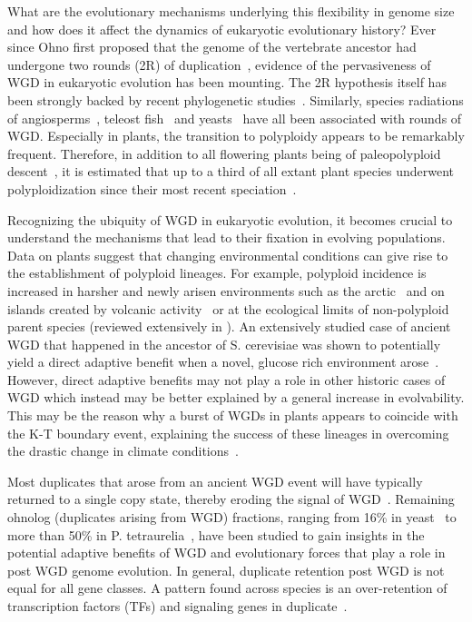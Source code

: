 What are the evolutionary mechanisms underlying this flexibility in genome size and how does it affect the dynamics of eukaryotic evolutionary history? Ever since Ohno first proposed that the genome of the vertebrate ancestor had undergone two rounds (2R) of duplication~\cite{ohno_evolution_1970}, evidence of the pervasiveness of WGD in eukaryotic evolution has been mounting. The 2R hypothesis itself has been strongly backed by recent phylogenetic studies~\cite{dehal_two_2005,nakatani_reconstruction_2007}. Similarly, species radiations of angiosperms~\cite{jiao_ancestral_2011}, teleost fish~\cite{jaillon_genome_2004} and yeasts~\cite{scannell_multiple_2006} have all been associated with rounds of WGD. Especially in plants, the transition to polyploidy appears to be remarkably frequent. Therefore, in addition to all flowering plants being of paleopolyploid descent~\cite{jiao_ancestral_2011,albert_amborella_2013}, it is estimated that up to a third of all extant plant species underwent polyploidization since their most recent speciation~\cite{mayrose_recently_2011}. 

Recognizing the ubiquity of WGD in eukaryotic evolution, it becomes crucial to understand the mechanisms that lead to their fixation in evolving populations. Data on plants suggest that changing environmental conditions can give rise to the establishment of polyploid lineages. For example, polyploid incidence is increased in harsher and newly arisen environments such as the arctic~\cite{brochmann_polyploidy_2004} and on islands created by volcanic activity~\cite{barrier_interspecific_1999} or at the ecological limits of non-polyploid parent species (reviewed extensively in \cite{beest_more_2012}). An extensively studied case of ancient WGD that happened in the ancestor of S. cerevisiae was shown to potentially yield a direct adaptive benefit when a novel, glucose rich environment arose~\cite{conant_increased_2007,van_hoek_metabolic_2009}. However, direct adaptive benefits may not play a role in other historic cases of WGD which instead may be better explained by a general increase in evolvability. This may be the reason why a burst of WGDs in plants appears to coincide with the K-T boundary event, explaining the success of these lineages in overcoming the drastic change in climate conditions~\cite{fawcett_plants_2009,van_de_peer_evolutionary_2009}.

Most duplicates that arose from an ancient WGD event will have typically returned to a single copy state, thereby eroding the signal of WGD~\cite{scannell_multiple_2006}. Remaining ohnolog (duplicates arising from WGD) fractions, ranging from 16\% in yeast~\cite{kellis_proof_2004} to more than 50\% in P. tetraurelia~\cite{aury_global_2006}, have been studied to gain insights in the potential adaptive benefits of WGD and evolutionary forces that play a role in post WGD genome evolution. In general, duplicate retention post WGD is not equal for all gene classes. A pattern found across species is an over-retention of transcription factors (TFs) and signaling genes in duplicate~\cite{huminiecki_polyploidy_2012,schnable_escape_2012,rodgers-melnick_contrasting_2012,bekaert_two-phase_2011,freeling_bias_2009,aury_global_2006}. 

